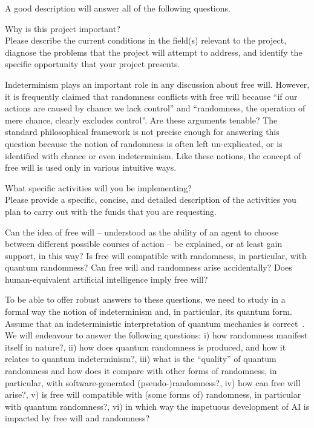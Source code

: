 \documentclass[11pt,  a4paper]{article}
\begin{document}
{\small \color{blue}  A good description will answer all of the following questions.}

\bigskip


{\small \color{blue}	
\noindent  Why is this project important?\\
Please describe the current conditions in the field(s) relevant to the project, diagnose
the problems that the project will attempt to address, and identify the specific opportunity that your project presents.
}




Indeterminism plays an important role in any discussion about free will.  However,
it is frequently claimed that randomness conflicts with free will because ``if our actions are caused by chance we lack control'' and ``randomness, the operation of mere chance, clearly excludes control''.
Are these arguments tenable?
The standard philosophical framework is not precise enough for answering this question because the notion of randomness is often left un-explicated, or is identified with chance or even indeterminism. Like these notions,  the concept of free will  is  used only in various  intuitive ways.



{\color{blue}	
 \noindent  What specific activities will you be implementing?\\
Please provide a specific, concise, and detailed description of the activities you plan to carry out with the funds that you are requesting.
}


  Can the idea of free will -- understood as the ability of an agent to choose between different possible courses of action -- be explained, or at least gain support, in this way?  Is free will compatible with randomness, in particular, with quantum randomness?  Can free will and randomness  arise  accidentally? Does human-equivalent artificial intelligence imply free will?




To be able to offer robust answers to these questions,  we need to study in a formal way the notion of  indeterminism and, in particular, its quantum form.
Assume that an indeterministic interpretation of quantum mechanics is correct~\cite{41}.  We will endeavour to answer the following  questions:
  i)  how randomness manifest itself in nature?,  ii) how does quantum randomness is produced, and how it relates to quantum indeterminism?,  iii) what is the ``quality'' of quantum randomness and how does it compare with other forms of randomness, in particular, with software-generated (pseudo-)randomness?,  iv)  how can free will arise?, v) is free will compatible with (some forms of) randomness, in particular with quantum randomness?, vi)   in which way the impetuous development of AI  is impacted by free will and randomness?
\end{document}
